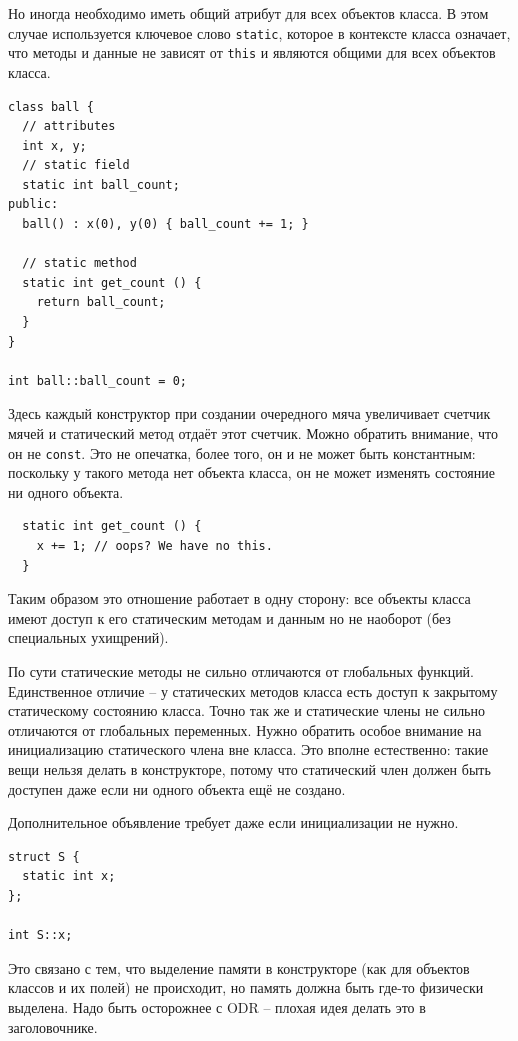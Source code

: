 \documentclass[a4paper,12pt,oneside]{article}
\begin{document}
Но иногда необходимо иметь общий атрибут для всех объектов класса. В этом случае используется ключевое слово \lstinline!static!, которое в контексте класса означает, что методы и данные не зависят от \lstinline!this! и являются общими для всех объектов класса.

\begin{lstlisting}
class ball {
  // attributes
  int x, y;
  // static field
  static int ball_count;
public: 
  ball() : x(0), y(0) { ball_count += 1; }

  // static method
  static int get_count () { 
    return ball_count; 
  }
}

int ball::ball_count = 0;
\end{lstlisting}

Здесь каждый конструктор при создании очередного мяча увеличивает счетчик мячей и статический метод отдаёт этот счетчик. Можно обратить внимание, что он не \lstinline!const!. Это не опечатка, более того, он и не может быть константным: поскольку у такого метода нет объекта класса, он не может изменять состояние ни одного объекта.

\begin{lstlisting}
  static int get_count () { 
    x += 1; // oops? We have no this.
  }
\end{lstlisting}

Таким образом это отношение работает в одну сторону: все объекты класса имеют доступ к его статическим методам и данным но не наоборот (без специальных ухищрений).

По сути статические методы не сильно отличаются от глобальных функций. Единственное отличие -- у статических методов класса есть доступ к закрытому статическому состоянию класса. Точно так же и статические члены не сильно отличаются от глобальных переменных. Нужно обратить особое внимание на инициализацию статического члена вне класса. Это вполне естественно: такие вещи нельзя делать в  конструкторе, потому что статический член должен быть доступен даже если ни одного объекта ещё не создано.

Дополнительное объявление требует даже если инициализации не нужно.

\begin{lstlisting}
struct S {
  static int x;
};

int S::x;
\end{lstlisting}

Это связано с тем, что выделение памяти в конструкторе (как для объектов классов и их полей) не происходит, но память должна быть где-то физически выделена. Надо быть осторожнее с ODR -- плохая идея делать это в заголовочнике.
\end{document}
